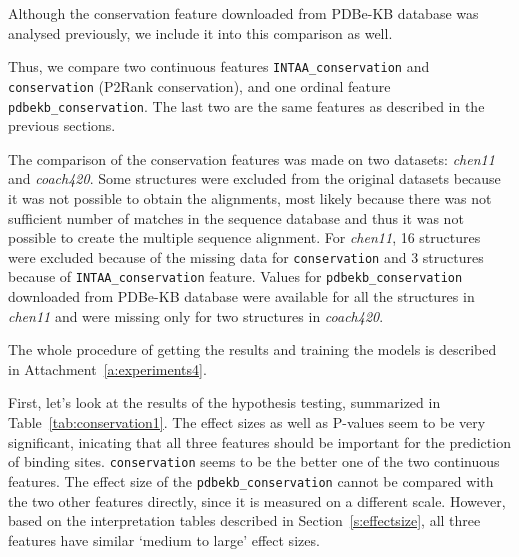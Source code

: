 Although the conservation feature downloaded from PDBe-KB database was analysed previously, we include it into this comparison as well.

Thus, we compare two continuous features \texttt{INTAA\_conservation} and \texttt{conser\-vation} (P2Rank conservation), and one ordinal feature \texttt{pdbekb\_conservation}. The last two are the same  features as described in the previous sections.

The comparison of the conservation features was made on two datasets: \textit{chen11} and \textit{coach420}. Some structures were excluded from the original datasets because it was not possible to obtain the alignments, most likely because there was not sufficient number of matches in the sequence database and thus it was not possible to create the multiple sequence alignment. For \textit{chen11}, 16 structures were excluded because of the missing data for \texttt{conservation} and 3 structures because of \texttt{INTAA\_conservation} feature. Values for \texttt{pdbekb\_conservation} downloaded from PDBe-KB database were available for all the structures in \textit{chen11} and were missing only for two structures in \textit{coach420}. 

The whole procedure of getting the results and training the models is described in Attachment~\ref{a:experiments4}.

First, let's look at the results of the hypothesis testing, summarized in Table~\ref{tab:conservation1}. The effect sizes as well as P-values seem to be very significant, inicating that all three features should be important for the prediction of binding sites. \texttt{conservation} seems to be the better one of the two continuous features. The effect size of the \texttt{pdbekb\_conservation} cannot be compared with the two other features directly, since it is measured on a different scale. However, based on the interpretation tables described in Section~\ref{s:effectsize}, all three features have similar `medium to large' effect sizes.

